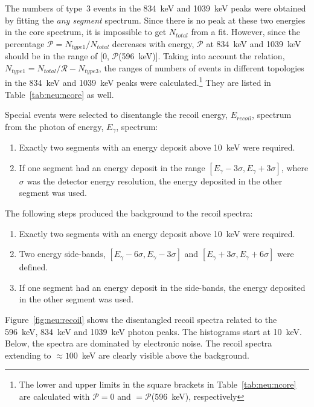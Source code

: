 The numbers of type~3 events in the 834~keV and 1039~keV peaks were
obtained by fitting the \emph{any segment} spectrum. Since there is no
peak at these two energies in the core spectrum, it is impossible to
get $N_{total}$ from a fit. However, since the percentage $\mathcal{P}
= N_{type1} / N_{total}$ decreases with energy, $\mathcal{P}$ at
834~keV and 1039~keV should be in the range of [0,
$\mathcal{P}$(596~keV)]. Taking into account the relation, $N_{type1}
= N_{total}/\mathcal{R} - N_{type3}$, the ranges of numbers of events
in different topologies in the 834~keV and 1039~keV peaks were
calculated.\footnote{The lower and upper limits in the square brackets
in Table~\ref{tab:neu:ncore} are calculated with $\mathcal{P} = 0$ and
$= \mathcal{P}$(596~keV), respectively} They are listed in
Table~\ref{tab:neu:ncore} as well.

Special events were selected to disentangle the recoil energy,
$E_{recoil}$, spectrum from the photon of energy, $E_\gamma$,
spectrum:
\begin{enumerate}
\item Exactly two segments with an energy deposit above 10~keV were
required.
\item If one segment had an energy deposit in the range
$[E_\gamma-3\sigma, E_\gamma+3\sigma]$, where $\sigma$ was the
detector energy resolution, the energy deposited in the other segment
was used.
\end{enumerate}

The following steps produced the background to the recoil spectra:
\begin{enumerate}
\item Exactly two segments with an energy deposit above 10~keV were
required.
\item Two energy side-bands, $[E_\gamma-6\sigma, E_\gamma-3\sigma]$
and $[E_\gamma+3\sigma, E_\gamma+6\sigma]$ were defined.
\item If one segment had an energy deposit in the side-bands, the
energy deposited in the other segment was used.
\end{enumerate}

Figure~\ref{fig:neu:recoil} shows the disentangled recoil spectra
related to the 596~keV, 834~keV and 1039~keV photon peaks. The
histograms start at 10~keV. Below, the spectra are dominated by
electronic noise. The recoil spectra extending to $\approx 100$~keV
are clearly visible above the background.

